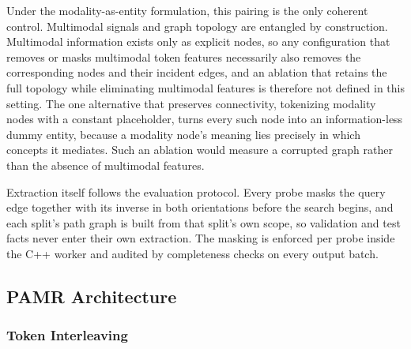 \documentclass[runningheads]{llncs}
\begin{document}
Under the modality-as-entity formulation, this pairing is the only
coherent control. Multimodal signals and graph topology are entangled by
construction. Multimodal information exists only as explicit nodes, so
any configuration that removes or masks multimodal token features
necessarily also removes the corresponding nodes and their incident
edges, and an ablation that retains the full topology while eliminating
multimodal features is therefore not defined in this setting. The one
alternative that preserves connectivity, tokenizing modality nodes with
a constant placeholder, turns every such node into an information-less
dummy entity, because a modality node's meaning lies precisely in which
concepts it mediates. Such an ablation would measure a corrupted graph
rather than the absence of multimodal features.

Extraction itself follows the evaluation protocol. Every probe masks
the query edge together with its inverse in both orientations before
the search begins, and each split's path graph is built from that
split's own scope, so validation and test facts never enter their own
extraction. The masking is enforced per probe inside the C++ worker
and audited by completeness checks on every output batch.

\subsection{PAMR Architecture}
\label{sec:pamr-architecture}

\subsubsection{Token Interleaving}
\label{sec:token-interleaving}
\end{document}
